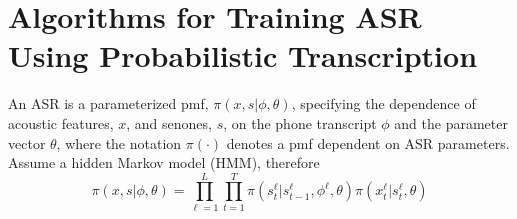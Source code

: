 \section{Algorithms for Training ASR Using Probabilistic Transcription}

An ASR is a parameterized pmf,
$\pi(x,s|\phi,\theta)$, specifying the dependence of
acoustic features, $x$, and senones, $s$, on the phone transcript
$\phi$ and the parameter vector $\theta$, where the notation
$\pi(\cdot)$ denotes a pmf dependent on ASR parameters.  
Assume a hidden Markov model (HMM), therefore
\[
\pi(x,s|\phi,\theta)=\prod_{\ell=1}^L \prod_{t=1}^T
\pi(s_t^\ell|s_{t-1}^\ell,\phi^\ell,\theta)\pi(x_t^\ell|s_t^\ell,\theta)
\]
